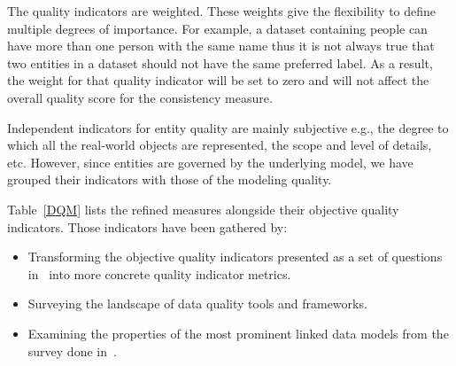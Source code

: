 The quality indicators are weighted. These weights give the flexibility to define multiple degrees of importance. For example, a dataset containing people can have more than one person with the same name thus it is not always true that two entities in a dataset should not have the same preferred label. As a result, the weight for that quality indicator will be set to zero and will not affect the overall quality score for the consistency measure.

Independent indicators for entity quality are mainly subjective e.g., the degree to which all the real-world objects are represented, the scope and level of details, etc. However, since entities are governed by the underlying model, we have grouped their indicators with those of the modeling quality.

Table~\ref{DQM} lists the refined measures alongside their objective quality indicators. Those indicators have been gathered by:

\begin{itemize}
	\item Transforming the objective quality indicators presented as a set of questions in~\cite{Assaf:DQMST:12} into more concrete quality indicator metrics.
	\item Surveying the landscape of data quality tools and frameworks.
	\item Examining the properties of the most prominent linked data models from the survey done in~\cite{Assaf:PROFILES:15}.
\end{itemize}

